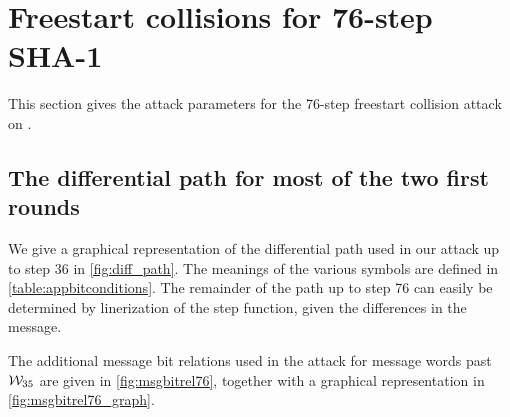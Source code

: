 \section{Freestart collisions for 76-step SHA-1}
\label{sec:res_76}

This section gives the attack parameters for the 76-step freestart collision attack on \shaone.

\subsection{The differential path for most of the two first rounds}
\label{sec:app_diff_path}

We give a graphical representation of the differential path
used in our attack up to step 36 in \autoref{fig:diff_path}.
The meanings of the various symbols are defined
in \autoref{table:appbitconditions}.
The remainder of the path up to step 76 can easily
be determined by linerization of the step function, given the differences
in the message.

The additional message bit relations used in the attack for message words past $\mathcal{W}_{35}$ are given in \autoref{fig:msgbitrel76}, together with a
graphical representation in \autoref{fig:msgbitrel76_graph}.

